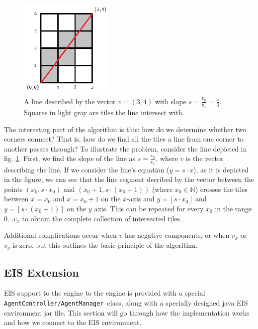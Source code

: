 \begin{figure}
\begin{centering}
\includegraphics[width=0.4\textwidth]{tilemapConnection}
\par\end{centering}

\caption{A line described by the vector $v=(3,4)$ with slope $s=\frac{v_{y}}{v_{x}}=\frac{4}{3}$.
Squares in light gray are tiles the line intersect with.\label{fig:ConnectingLine}}
\end{figure}


The interesting part of the algorithm is this: how do we determine
whether two corners connect? That is, how do we find all the tiles
a line from one corner to another passes through? To illustrate the
problem, consider the line depicted in fig. \ref{fig:ConnectingLine}.
First, we find the slope of the line as $s=\frac{v_{y}}{v_{x}}$,
where $v$ is the vector describing the line. If we consider the line's
equation ($y=s\cdot x$), as it is depicted in the figure, we can
see that the line segment decribed by the vector between the points
$\left(x_{0},s\cdot x_{0}\right)$ and $\left(x_{0}+1,s\cdot\left(x_{0}+1\right)\right)$
(where $x_{0}\in\mathbb{N}$) crosses the tiles between $x=x_{0}$
and $x=x_{0}+1$ on the $x$-axis and $y=\left\lfloor s\cdot x_{0}\right\rfloor $
and $y=\left\lceil s\cdot\left(x_{0}+1\right)\right\rceil $ on the
$y$ axis. This can be repeated for every $x_{0}$ in the range $0\dots v_{x}$
to obtain the complete collection of intersected tiles.

Additional complications occur when $v$ has negative components,
or when $v_{x}$ or $v_{y}$ is zero, but this outlines the basic
principle of the algorithm.


\subsection{EIS Extension}

EIS support to the engine to the engine is provided with a special
\texttt{AgentController/AgentManager }class, along with a specially
designed java EIS environment jar file. This section will go through
how the implementation works and how we connect to the EIS environment.

